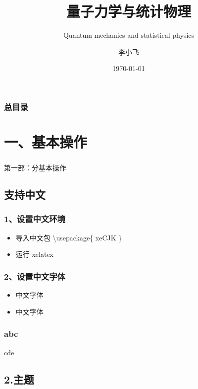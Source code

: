 \documentclass[12pt,aspectratio=169,mathserif]{beamer}
\newcommand{\myfont}{\CJKfamily{nicefont}}%
\begin{document}
  

\author {李小飞}
\title{\textbf{量子力学与统计物理}}
\subtitle{Quantum mechanics and statistical physics}
\date{\today}

    \frame[plain]{\titlepage}
    \begin{frame}
        \frametitle{总目录}
        \tableofcontents
    \end{frame}

\section{一、基本操作}

\begin{frame}
    \frametitle{}
    第一部：分基本操作  
\end{frame}


\subsection{ 支持中文}

\begin{frame}
    \frametitle{1、设置中文环境}
    \begin{itemize}
     \item  导入中文包 \textbackslash usepackage\{ xeCJK \}
     \item  运行 xelatex
    \end{itemize}
\end{frame}

\begin{frame}
    \frametitle{2、设置中文字体}
    \begin{itemize}
     \item  {\myfont 中文字体 }
     \item  { 中文字体}
    \end{itemize}
\end{frame}

\begin{frame}
    \frametitle{abc}

    cde

\end{frame}

\subsection{2.主题}
\end{document}
